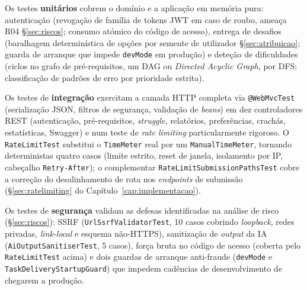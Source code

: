 \begin{table}[htb]
\centering
\caption{Suite de testes automatizados: dimensão e caracterização por nível.}
\label{tab:suite-dimensao}
\end{table}

Os testes \textbf{unitários} cobrem o domínio e a aplicação em memória pura: autenticação (revogação de família de tokens JWT em caso de roubo, ameaça R04 §\ref{sec:riscos}; consumo atómico do código de acesso), entrega de desafios (baralhagem determinística de opções por semente de utilizador §\ref{sec:atribuicao}; guarda de arranque que impede \texttt{devMode} em produção) e deteção de dificuldades (ciclos no grafo de pré-requisitos, um DAG ou \textit{Directed Acyclic Graph}, por DFS; classificação de padrões de erro por prioridade estrita).

Os testes de \textbf{integração} exercitam a camada HTTP completa via \texttt{@WebMvcTest} (serialização JSON, filtros de segurança, validação de \textit{beans}) em dez controladores REST (autenticação, pré-requisitos, \textit{struggle}, relatórios, preferências, crachás, estatísticas, Swagger) e num teste de \textit{rate limiting} particularmente rigoroso.\label{sec:testes-rate-int} O \texttt{RateLimitTest} substitui o \texttt{TimeMeter} real por um \texttt{ManualTimeMeter}, tornando deterministas quatro casos (limite estrito, reset de janela, isolamento por IP, cabeçalho \texttt{Retry-After}); o complementar \texttt{RateLimitSubmissionPathsTest} cobre a correção do desalinhamento de rota nos \textit{endpoints} de submissão (§\ref{sec:ratelimiting} do Capítulo~\ref{cap:implementacao}).

Os testes de \textbf{segurança} validam as defesas identificadas na análise de risco (§\ref{sec:riscos}): SSRF (\texttt{UrlSsrfValidatorTest}, 10 casos cobrindo \textit{loopback}, redes privadas, \textit{link-local} e esquema não-HTTPS), sanitização de \textit{output} da IA (\texttt{AiOutputSanitiserTest}, 5 casos), força bruta no código de acesso (coberta pelo \texttt{RateLimitTest} acima) e dois guardas de arranque anti-fraude (\texttt{devMode} e \texttt{TaskDeliveryStartupGuard}) que impedem cadências de desenvolvimento de chegarem a produção.


